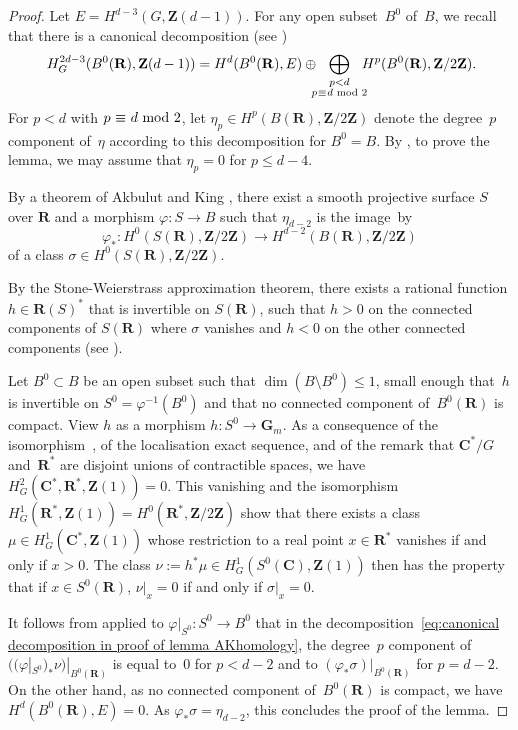 \documentclass[JEP,XML,SOM,Unicode]{cedram}
\theoremstyle{plain}
\theoremstyle{definition}
\numberwithin{equation}{section}
\renewcommand{\C}{{\mathbf C}}
\newcommand{\R}{{\mathbf R}}
\newcommand{\Z}{{\mathbf Z}}
\renewcommand{\phi}{\varphi}
\begin{document}
\begin{proof}
Let $E=H^{d-3}(G,\Z(d-1))$.
For any open subset~$B^0$ of~$B$, we recall that there is a canonical decomposition
(see \cite[(\ref*{BW1-eq:canonical decomposition})]{BW1})
\begin{align}
\label{eq:canonical decomposition in proof of lemma AKhomology}
H^{2d-3}_G(B^0(\R),\Z(d-1)) = H^d(B^0(\R),E)\oplus \mkern-10mu\bigoplus_{\substack{p<d \\ p\mkern1mu\equiv\mkern1mu d \text{ mod } 2}}\mkern-10muH^p(B^0(\R),\Z/2\Z)\rlap{.}
\end{align}
For $p<d$ with $p\mkern1mu\equiv\mkern1mu d \text{ mod } 2$, let $\eta_p \in H^p(B(\R),\Z/2\Z)$ denote the degree~$p$ component of~$\eta$
according to this decomposition for $B^0=B$.
By \cite[Prop.\,\ref*{BW1-prop:truncated projection integral coeff}]{BW1}, to prove the lemma, we may assume that $\eta_p=0$ for $p\leq d-4$.

By a theorem of Akbulut and King \cite[Lem.\,9\,(1)]{AKhomology}, there exist a smooth projective surface $S$ over $\R$ and a morphism $\varphi: S\to B$ such that $\eta_{d-2}$ is the image~by
\[
\varphi_*:H^0(S(\R),\Z/2\Z)\to H^{d-2}(B(\R),\Z/2\Z)
\]
of a class $\sigma\in H^0(S(\R),\Z/2\Z)$.

By the Stone-Weierstrass approximation theorem, there exists a rational
function $h\in\R(S)^*$ that is invertible on $S(\R)$, such that $h>0$ on the
connected components of $S(\R)$ where $\sigma$ vanishes and $h<0$ on the
other connected components (see \cite[Th.\,3.4.4 and Th.\,8.8.5]{bcr}).

Let $B^0 \subset B$ be an open subset such that $\dim(B\setminus B^0)\leq 1$,
small enough that~$h$ is invertible on $S^0=\phi^{-1}(B^0)$
and that no connected component of~$B^0(\R)$ is compact.
View $h$ as a morphism $h:S^0\to\mathbf{G}_m$.
As a consequence of the isomorphism~\cite[(\ref*{BW1-eq:cohomological dimension iso relative})]{BW1},
of the localisation exact sequence, and of the remark
that $\C^*/G$ and~$\R^*$ are disjoint unions of contractible spaces, we
have $H^2_G(\C^*,\R^*,\Z(1))=0$. This vanishing and the isomorphism
$H^1_G(\R^*,\Z(1))= H^0(\R^*,\Z/2\Z)$ \cite[(\ref*{BW1-eq:canonical decomposition})]{BW1}
show that there exists a class $\mu\in H^1_G(\C^*,\Z(1))$ whose
restriction to a real point $x\in\R^*$ vanishes if and only if $x>0$.
The class
$\nu:=h^*\mu\in H^1_G(S^0(\C),\Z(1))$ then has the property that
if $x\in S^0(\R)$, $\nu|_x=0$ if and only if $\sigma|_x=0$.

It follows from \cite[\textsection\ref*{BW1-subsubsec:reduction modulo 2} \& Prop.\,\ref*{BW1-prop:differentiable rr}]{BW1}
applied to $\varphi|_{S^0}:S^0\to B^0$ that
in the decomposition~\eqref{eq:canonical decomposition in proof of lemma AKhomology},
the degree~$p$ component of $((\varphi|_{S^0})_*\nu)|_{B^0(\R)}$ is equal to~$0$ for $p<d-2$
and to $(\phi_*\sigma)|_{B^0(\R)}$ for $p=d-2$.
On the other hand, as no connected component of~$B^0(\R)$ is compact,
we have $H^d(B^0(\R),E)=0$.
As $\phi_*\sigma=\eta_{d-2}$, this concludes the proof of the lemma.
\end{proof}
\end{document}
